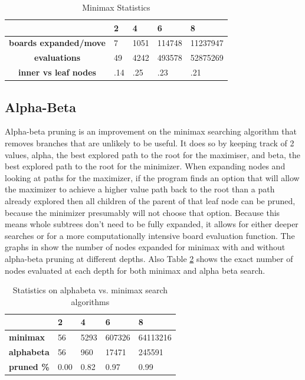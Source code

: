 \documentclass{article}
\begin{document}
\begin{table}[]
\centering
\caption{Minimax Statistics}
\label{minimax-stats}
\begin{tabular}{|l|l|l|l|l|}
\hline
& \textbf{2} & \textbf{4} & \textbf{6} & \textbf{8} \\ \hline
\textbf{boards expanded/move}                      & 7   & 1051 & 114748 & 11237947 \\ \hline
\multicolumn{1}{|c|}{\textbf{ evaluations}}        & 49  & 4242 & 493578 & 52875269 \\ \hline
\multicolumn{1}{|c|}{\textbf{ inner vs leaf nodes}} & .14 & .25  & .23    & .21      \\ \hline
\end{tabular}
\end{table}

\subsection{Alpha-Beta}

Alpha-beta pruning is an improvement on the minimax searching algorithm that
removes branches that are unlikely to be useful. It does so by keeping track of
2 values, alpha, the best explored path to the root for the maximiser, and
beta, the best explored path to the root for the minimizer. When expanding
nodes and looking at paths for the maximizer, if the program finds an option
that will allow the maximizer to achieve a higher value path back to the root
than a path already explored then all children of the parent of that leaf node
can be pruned, because the minimizer presumably will not choose that option.
Because this means whole subtrees don’t need to be fully expanded, it allows
for either deeper searches  or for a more computationally intensive board
evaluation function. The graphs in  show the number of nodes expanded for
minimax with and without alpha-beta pruning at different depths. Also Table \ref{ab-v-mm}
shows the exact number of nodes evaluated at each depth for both minimax and alpha beta
search.

\begin{table}[]
\centering
\caption{Statistics on alphabeta vs. minimax search algorithms}
\label{ab-v-mm}
\begin{tabular}{|l|l|l|l|l|}
\hline
& \textbf{2}    & \textbf{4}   & \textbf{6}      & \textbf{8}        \\ \hline
\textbf{minimax}   & 56   & 5293 & 607326 & 64113216 \\ \hline
\textbf{alphabeta} & 56   & 960  & 17471  & 245591   \\ \hline
\textbf{pruned \%} & 0.00 & 0.82 & 0.97   & 0.99     \\ \hline
\end{tabular}
\end{table}
\end{document}
